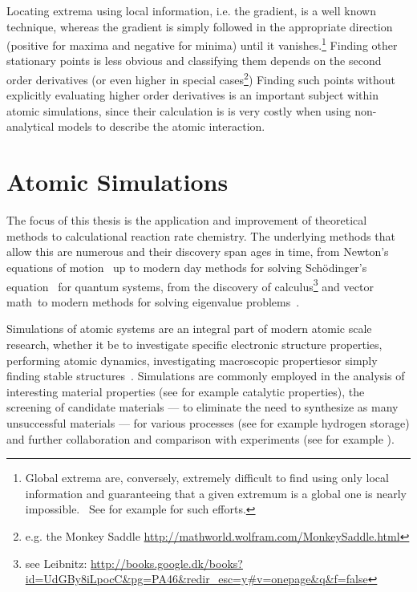 Locating extrema using local information, i.e. the gradient, is a well known technique\citemiss, whereas the gradient is simply followed in the appropriate direction (positive for maxima and negative for minima) until it vanishes.\footnote{Global extrema are, conversely, extremely difficult to find using only local information and guaranteeing that a given extremum is a global one is nearly impossible.~\cite{Stillinger1999} See for example \cite{Wang2010, Wales1999, Pickard2011, Oganov2008, Kirkpatrick1983, Johnston2003, Fischer2006} for such efforts.}
Finding other stationary points is less obvious and classifying them depends on the second order derivatives (or even higher in special cases\footnote{e.g. the Monkey Saddle \url{http://mathworld.wolfram.com/MonkeySaddle.html}})
Finding such points without explicitly evaluating higher order derivatives is an important subject within atomic simulations, since their calculation is is very costly when using non-analytical models to describe the atomic interaction.

\section{Atomic Simulations}
The focus of this thesis is the application and improvement of theoretical methods to calculational reaction rate chemistry.
The underlying methods that allow this are numerous and their discovery span ages in time, from Newton's equations of motion~\cite{newton-latin} up to modern day methods for solving Sch\"odinger's equation~\cite{schrodinger-equation-1926} for quantum systems\cite{hohenberg-kohn-1964, gpaw-review-2010, dacapo-1999}, from the discovery of calculus\citemiss\footnote{see Leibnitz: \url{http://books.google.dk/books?id=UdGBy8iLpocC&pg=PA46&redir_esc=y\#v=onepage&q&f=false}} and vector math~\citemiss to modern methods for solving eigenvalue problems~\cite{eigenvalue-problems-2000}.

Simulations of atomic systems are an integral part of modern atomic scale research, whether it be to investigate specific electronic structure properties\citemiss, performing atomic dynamics\citemiss, investigating macroscopic properties\citemiss or simply finding stable structures~\citemiss.
Simulations are commonly employed in the analysis of interesting material properties (see for example catalytic properties\citemiss), the screening of candidate materials --- to eliminate the need to synthesize as many unsuccessful materials --- for various processes (see for example hydrogen storage\citemiss) and further collaboration and comparison with experiments (see for example \citemiss).

